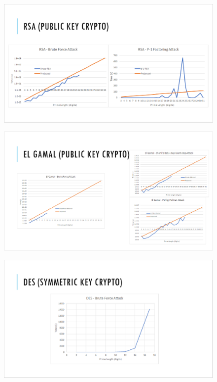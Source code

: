 \documentclass[12pt]{report}
\begin{document}
\begin{figure}[hp!] %
    \begin{center}
        \includegraphics[width=0.85\linewidth]{Pictures/slide5.PNG}
        \label{fig:slide5}
    \end{center}
\end{figure}

\begin{figure}[hp!] %
    \begin{center}
        \includegraphics[width=0.85\linewidth]{Pictures/slide6.PNG}
        \label{fig:slide6}
    \end{center}
\end{figure}

\begin{figure}[hp!] %
    \begin{center}
        \includegraphics[width=0.85\linewidth]{Pictures/slide7.PNG}
        \label{fig:slide7}
    \end{center}
\end{figure}
\end{document}

